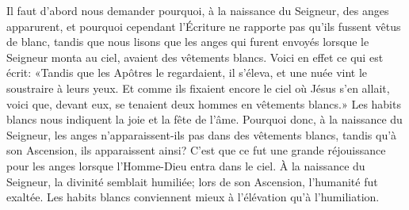 Il faut d’abord nous demander pourquoi,
		à la naissance du Seigneur, des anges apparurent,
	et pourquoi cependant l’Écriture ne rapporte pas
		qu’ils fussent vêtus de blanc,
	tandis que nous lisons que les anges
		qui furent envoyés lorsque le Seigneur monta au ciel,
	avaient des vêtements blancs.
Voici en effet ce qui est écrit:
	«Tandis que les Apôtres le regardaient,
	il s’éleva, et une nuée vint le soustraire à leurs yeux.
Et comme ils fixaient encore le ciel où Jésus s’en allait,
	voici que, devant eux, se tenaient deux hommes en vêtements blancs.»
Les habits blancs nous indiquent la joie et la fête de l’âme.
Pourquoi donc, à la naissance du Seigneur,
	les anges n’apparaissent-ils pas dans des vêtements blancs,
	tandis qu’à son Ascension, ils apparaissent ainsi?
C’est que ce fut une grande réjouissance pour les anges
	lorsque l’Homme-Dieu entra dans le ciel.
À la naissance du Seigneur, la divinité semblait humiliée;
	lors de son Ascension, l’humanité fut exaltée.
	Les habits blancs conviennent mieux à l’élévation qu’à l’humiliation.
